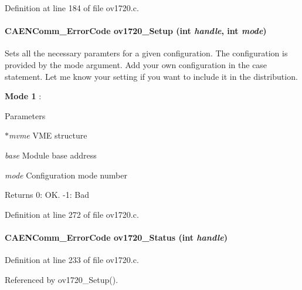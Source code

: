 Definition at line 184 of file ov1720.c.
\paragraph[{ov1720\_\-Setup}]{\setlength{\rightskip}{0pt plus 5cm}CAENComm\_\-ErrorCode ov1720\_\-Setup (int {\em handle}, \/  int {\em mode})}\hfill\label{ov1720drv_8h_a31f37ce79cfd3a277fcc2856b027ef85}
Sets all the necessary paramters for a given configuration. The configuration is provided by the mode argument. Add your own configuration in the case statement. Let me know your setting if you want to include it in the distribution.
\begin{DoxyItemize}
\item {\bfseries Mode 1} :
\end{DoxyItemize}


\begin{DoxyParams}{Parameters}
\item[{\em $\ast$mvme}]VME structure \item[{\em base}]Module base address \item[{\em mode}]Configuration mode number \end{DoxyParams}
\begin{DoxyReturn}{Returns}
0: OK. -\/1: Bad 
\end{DoxyReturn}


Definition at line 272 of file ov1720.c.
\paragraph[{ov1720\_\-Status}]{\setlength{\rightskip}{0pt plus 5cm}CAENComm\_\-ErrorCode ov1720\_\-Status (int {\em handle})}\hfill\label{ov1720drv_8h_a8228836ab49d61336f0e83ad0c2945bb}


Definition at line 233 of file ov1720.c.

Referenced by ov1720\_\-Setup().